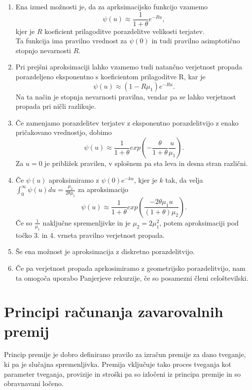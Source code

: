 \documentclass[a4paper,12pt]{homework}
\begin{document}
	\begin{enumerate}
		\item Ena izmed možnosti je, da za aprksimacijsko funkcijo vzamemo 
		\[
		\psi(u) \approx \frac{1}{1 + \theta} e^{-Ru},
		\]
		kjer je $R$ koeficient prilagoditve porazdelitve velikosti terjatev. 
		\\Ta funkcija ima pravilno vrednost za $\psi(0)$ in tudi pravilno asimptotično stopnjo nevarnosti $R$.
		\item Pri prejšni aproksimaciji lahko vzamemo tudi natančno verjetnost propada porazdeljeno eksponentno s koeficientom prilagoditve R, kar je
		\[
		\psi(u) \approx (1 - R\mu_1)e^{-Ru}.
		\]
		Na ta način je stopnja nevarnosti pravilna, vendar pa se lahko verjetnost propada pri ničli razlikuje.
		\item Če zamenjamo porazdelitev terjatev z eksponentno porazdelitvijo z enako pričakovano vrednostjo, dobimo
		\[
		\psi(u) \approx \frac{1}{1 + \theta} exp(-\frac{\theta}{1+ \theta}\frac{u}{\mu_1}).
		\]
		Za $u=0$ je približek pravilen, v splošnem pa sta leva in desna stran različni.
		\item Če $\psi(u)$ aproksimiramo z $\psi(0)e^{-ku}$, kjer je $k$ tak, da velja $\int_{0}^{\infty} \psi(u) du = \frac{\mu_2}{2\theta \mu_1}$ za aproksimacijo 
		\[
		\psi(u) \approx \frac{1}{1 + \theta} exp(\frac{-2\theta \mu_1 u}{(1 + \theta)\mu_2}).
		\]
		Če so $\frac{1}{\mu_1}$ naključne spremenljivke in je $\mu_2 = 2\mu_1^2$, potem aproksimaciji pod točko 3. in 4. vrneta pravilno verjetnost propada.
		\item Še ena možnost je aproksimacija z diskretno porazdelitvijo. 
		\item Če pa verjetnost propada aprkosimiramo z geometrijsko porazdelitvijo, nam ta omogoča uporabo Panjerjeve rekurzije, če so posamezni členi celoštevilski.
	\end{enumerate}
	
	\section{Principi računanja zavarovalnih premij}
	Princip premije je dobro definirano pravilo za izračun premije za dano tveganje, ki pa je slučajna spremenljivka. Premija vključuje tako proces tveganja kot parameter tveganja, provizije in stroški pa so izločeni iz principa premije in so obravnavani ločeno.
	
\end{document}
